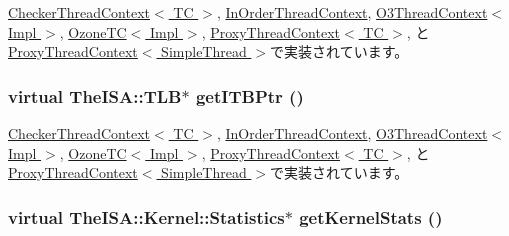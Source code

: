 \hyperlink{classCheckerThreadContext_a2fe6a07c44bc2a4d83b86bea605ba971}{CheckerThreadContext$<$ TC $>$}, \hyperlink{classInOrderThreadContext_a2fe6a07c44bc2a4d83b86bea605ba971}{InOrderThreadContext}, \hyperlink{classO3ThreadContext_a2fe6a07c44bc2a4d83b86bea605ba971}{O3ThreadContext$<$ Impl $>$}, \hyperlink{classOzoneCPU_1_1OzoneTC_a2fe6a07c44bc2a4d83b86bea605ba971}{OzoneTC$<$ Impl $>$}, \hyperlink{classProxyThreadContext_a2fe6a07c44bc2a4d83b86bea605ba971}{ProxyThreadContext$<$ TC $>$}, と \hyperlink{classProxyThreadContext_a2fe6a07c44bc2a4d83b86bea605ba971}{ProxyThreadContext$<$ SimpleThread $>$}で実装されています。\hypertarget{classThreadContext_aaae22e0dcf2f312619915bbf34509ba4}{
\subsubsection[{getITBPtr}]{\setlength{\rightskip}{0pt plus 5cm}virtual TheISA::TLB$\ast$ getITBPtr ()}}
\label{classThreadContext_aaae22e0dcf2f312619915bbf34509ba4}


\hyperlink{classCheckerThreadContext_a95b7e95d0558cd03d69613142fff9137}{CheckerThreadContext$<$ TC $>$}, \hyperlink{classInOrderThreadContext_a95b7e95d0558cd03d69613142fff9137}{InOrderThreadContext}, \hyperlink{classO3ThreadContext_a95b7e95d0558cd03d69613142fff9137}{O3ThreadContext$<$ Impl $>$}, \hyperlink{classOzoneCPU_1_1OzoneTC_a95b7e95d0558cd03d69613142fff9137}{OzoneTC$<$ Impl $>$}, \hyperlink{classProxyThreadContext_a95b7e95d0558cd03d69613142fff9137}{ProxyThreadContext$<$ TC $>$}, と \hyperlink{classProxyThreadContext_a95b7e95d0558cd03d69613142fff9137}{ProxyThreadContext$<$ SimpleThread $>$}で実装されています。\hypertarget{classThreadContext_a85141770510cf256c27f10adece17ed5}{
\subsubsection[{getKernelStats}]{\setlength{\rightskip}{0pt plus 5cm}virtual TheISA::Kernel::Statistics$\ast$ getKernelStats ()}}
\label{classThreadContext_a85141770510cf256c27f10adece17ed5}


